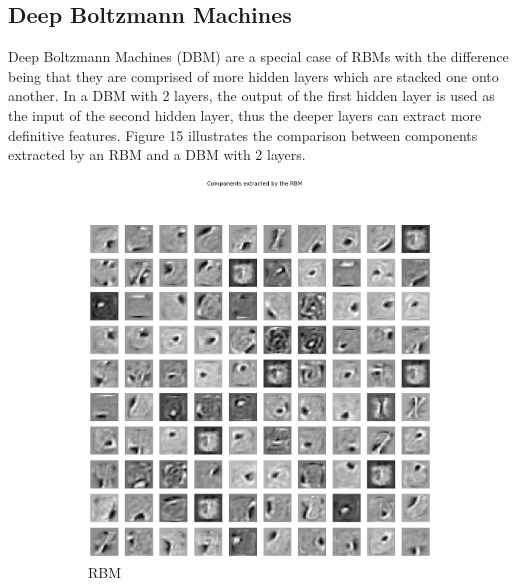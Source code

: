 \documentclass[11pt,conference,compsoc]{IEEEtran}
\begin{document}
\subsection{Deep Boltzmann Machines}
Deep Boltzmann Machines (DBM) are a special case of RBMs with the difference being that they are comprised of more hidden layers which are stacked one onto another. In a DBM with 2 layers, the output of the first hidden layer is used as the input of the second hidden layer, thus the deeper layers can extract more definitive features. Figure 15 illustrates the comparison between components extracted by an RBM and a DBM with 2 layers. 

\begin{figure}[]
        \centering
        \begin{subfigure}{0.30\linewidth}
            \includegraphics[width=\linewidth]{images/componentsRBM_neur=100.png}
            \caption{RBM}
        \end{subfigure}
         \begin{subfigure}{0.30\linewidth}

\end{subfigure}
\end{figure}
\end{document}
